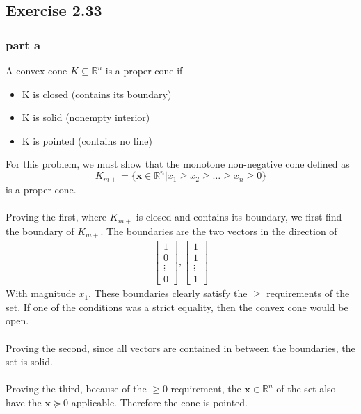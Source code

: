 \subsection{Exercise 2.33}
\subsubsection{part a}
A convex cone $K \subseteq \mathbb{R}^n$ is a proper cone if
\begin{itemize}
  \item K is closed (contains its boundary)
  \item K is solid (nonempty interior)
  \item K is pointed (contains no line)
\end{itemize}
For this problem, we must show that the monotone non-negative cone defined as 
\begin{equation}
  K_{m+} = \{ \textbf{x} \in \mathbb{R}^n | x_1 \geq x_2 \geq \dots \geq x_n \geq 0 \}
\end{equation}
is a proper cone.
\\ \\
Proving the first, where $K_{m+}$ is closed and contains its boundary, we first find the boundary of $K_{m+}$. The boundaries are the two vectors in the direction of 
\begin{align}
  \begin{bmatrix}
     1 \\
     0 \\
     \vdots \\
     0
  \end{bmatrix},
  \begin{bmatrix}
    1 \\
    1 \\
    \vdots \\
    1
  \end{bmatrix}
\end{align}
With magnitude $x_1$. These boundaries clearly satisfy the $\geq$ requirements of the set. If one of the conditions was a strict equality, then the convex cone would be open.
\\ \\
Proving the second, since all vectors are contained in between the boundaries, the set is solid.
\\ \\ 
Proving the third, because of the $\geq 0$ requirement, the $\textbf{x}\in \mathbb{R}^n$ of the set also have the $\textbf{x} \succeq 0 $ applicable. Therefore the cone is pointed.
